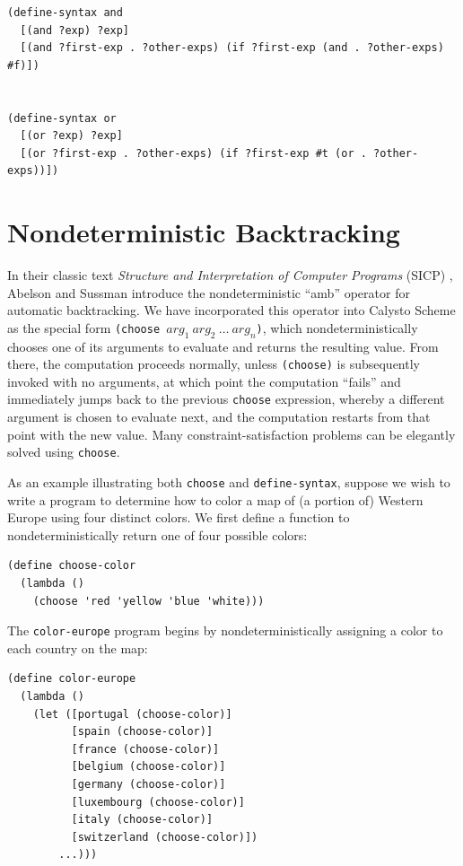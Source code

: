 \documentclass[acmsmall,screen,authorversion]{acmart}
\begin{document}
\begin{verbatim}
(define-syntax and
  [(and ?exp) ?exp]
  [(and ?first-exp . ?other-exps) (if ?first-exp (and . ?other-exps) #f)])


(define-syntax or
  [(or ?exp) ?exp]
  [(or ?first-exp . ?other-exps) (if ?first-exp #t (or . ?other-exps))])
\end{verbatim}

\section{Nondeterministic Backtracking}

\noindent
In their classic text \emph{Structure and Interpretation of Computer Programs}
(SICP) \cite{SICP}, Abelson and Sussman introduce the nondeterministic ``amb''
operator for automatic backtracking.  We have incorporated this operator into
Calysto Scheme as the special form
\texttt{(choose~$\mathit{arg}_1~\mathit{arg}_2~\ldots~\mathit{arg}_n$)}, which
nondeterministically chooses one of its arguments to evaluate and returns the
resulting value.  From there, the computation proceeds normally, unless
\texttt{(choose)} is subsequently invoked with no arguments, at which point the
computation ``fails'' and immediately jumps back to the previous
\texttt{choose} expression, whereby a different argument is chosen to evaluate
next, and the computation restarts from that point with the new value.  Many
constraint-satisfaction problems can be elegantly solved using \texttt{choose}.

As an example illustrating both \texttt{choose} and
\texttt{define-syntax}, suppose we wish to write a program to determine how to
color a map of (a portion of) Western Europe using four distinct colors.  We
first define a function to nondeterministically return one of four possible
colors:

{\small
\begin{verbatim}
(define choose-color
  (lambda ()
    (choose 'red 'yellow 'blue 'white)))
\end{verbatim}
}

\noindent
The \texttt{color-europe} program begins by nondeterministically assigning a
color to each country on the map:

{\small
\begin{verbatim}
(define color-europe
  (lambda ()
    (let ([portugal (choose-color)]
          [spain (choose-color)]
          [france (choose-color)]
          [belgium (choose-color)]
          [germany (choose-color)]
          [luxembourg (choose-color)]
          [italy (choose-color)]
          [switzerland (choose-color)])
        ...)))
\end{verbatim}
}
\end{document}
